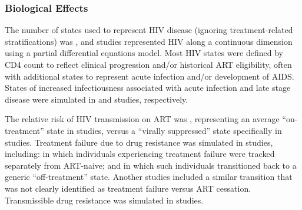 \subsubsection{Biological Effects}
\label{sss:res:bio}
The \xdmdef number of states used to represent HIV disease
(ignoring treatment-related stratifications) was ,
and  studies represented HIV along a continuous dimension
using a partial differential equations model.
Most HIV states were defined by CD4 count
to reflect clinical progression and/or historical ART eligibility,
often with additional states to represent acute infection and/or development of AIDS.
States of increased infectiousness associated with acute infection and late stage disease
were simulated in  and  studies, respectively.
\par
The relative risk of HIV transmission on ART was ,
representing an average ``on-treatment'' state in  studies,
versus a ``virally suppressed'' state specifically in  studies.
Treatment failure due to drug resistance was simulated in  studies, including:
 in which individuals experiencing treatment failure
were tracked separately from ART-naive; and
 in which such individuals
transitioned back to a generic ``off-treatment'' state.
Another  studies included a similar transition
that was not clearly identified as treatment failure versus ART cessation.
Transmissible drug resistance was simulated in  studies.
